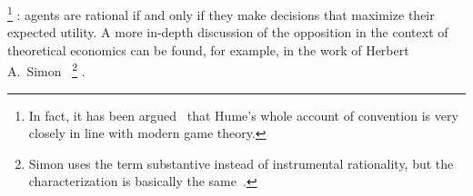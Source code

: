 \documentclass[a4paper]{article}
\begin{document}
\footnote{In fact, it has been argued~\parencite{vanderschraaf_informal_1998} that Hume's whole account of convention is very closely in line with modern game theory.}%
: agents are rational if and only if they make decisions that maximize their expected utility.
A more in-depth discussion of the opposition in the context of theoretical economics can be found, for example, in the work of Herbert A.~Simon~\parencite*[\emph{e.g.}][]{simon_rationality_1986}%
\footnote{Simon uses the term substantive instead of instrumental rationality, but the characterization is basically the same~\parencite[210-212]{simon_rationality_1986}.}%
.
\end{document}
